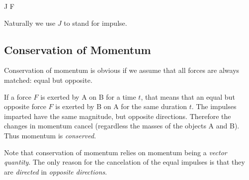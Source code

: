 \begin{nedqn}
  J
  \int F \dt
\end{nedqn}

Naturally we use $J$ to stand for impulse.

\subsection{Conservation of Momentum}

Conservation of momentum is obvious if we assume that all forces are
always matched: equal but opposite.

If a force $F$ is exerted by A on B for a time $t$, that means that an
equal but opposite force $F$ is exerted by B on A for the same duration
$t$. The impulses imparted have the same magnitude, but opposite
directions. Therefore the changes in momentum cancel (regardless the
masses of the objects A and B). Thus momentum is \emph{conserved}.

Note that conservation of momentum relies on momentum being a
\emph{vector quantity}. The only reason for the cancelation of the equal
impulses is that they are \emph{directed} in \emph{opposite directions}.
